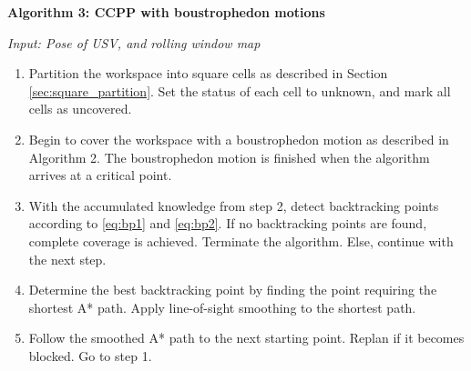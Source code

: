 \begin{tcolorbox}

\textbf{Algorithm 3: CCPP with boustrophedon motions}

\emph{Input: Pose of USV, and rolling window map }

\begin{enumerate}
\itemsep0em

\item Partition the workspace into square cells as described in Section \ref{sec:square_partition}. Set the status of each cell to unknown, and mark all cells as uncovered.

\item Begin to cover the workspace with a boustrophedon motion as described in Algorithm 2. The boustrophedon motion is finished when the algorithm arrives at a critical point.

\item With the accumulated knowledge from step 2, detect backtracking points according to \eqref{eq:bp1} and \eqref{eq:bp2}. If no backtracking points are found, complete coverage is achieved. Terminate the algorithm. Else, continue with the next step.

\item Determine the best backtracking point by finding the point requiring the shortest A* path. Apply line-of-sight smoothing to the shortest path.

\item Follow the smoothed A* path to the next starting point. Replan if it becomes blocked. Go to step 1.

\end{enumerate}

\end{tcolorbox}


